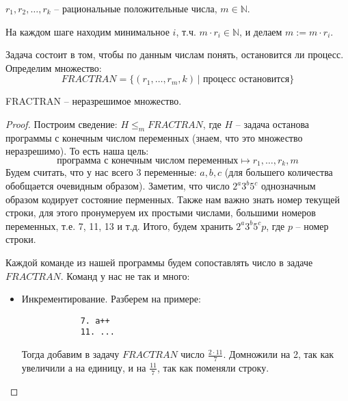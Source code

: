 $r_1, r_2, \dots, r_k$ -- рациональные положительные числа, $m \in \mathbb{N}$.

На каждом шаге находим минимальное $i$, т.ч. $m \cdot r_i \in \mathbb{N}$, и делаем $m := m \cdot r_i$.

Задача состоит в том, чтобы по данным числам понять, остановится ли процесс. Определим множество: \[ FRACTRAN = \{ (r_1, \dots, r_m, k) \, | \text{ процесс остановится} \} \]

\begin{theorem}
    FRACTRAN -- неразрешимое множество.
\end{theorem}
\begin{proof}
    Построим сведение: $H \leqslant_m FRACTRAN$, где $H$ -- задача останова программы с конечным числом переменных (знаем, что это множество неразрешимо). То есть наша цель: \[ \text{программа с конечным числом переменных} \mapsto r_1, \dots, r_k, m \]
    Будем считать, что у нас всего 3 переменные: $a, b, c$ (для большего количества обобщается очевидным образом). Заметим, что число $2^a3^b5^c$ однозначным образом кодирует состояние перменных. Также нам важно знать номер текущей строки, для этого пронумеруем их простыми числами, большими номеров переменных, т.е. 7, 11, 13 и т.д. Итого, будем хранить  $2^a3^b5^cp$, где $p$ -- номер строки. 

    Каждой команде из нашей программы будем сопоставлять число в задаче $FRACTRAN$. Команд у нас не так и много: \begin{itemize}
        \item Инкрементирование. Разберем на примере: \begin{lstlisting}
            7. a++
            11. ...
        \end{lstlisting}
        Тогда добавим в задачу $FRACTRAN$ число $\frac{2 \cdot 11}{7}$. Домножили на 2, так как увеличили а на единицу, и на $\frac{11}{7}$, так как поменяли строку.


\end{itemize}
\end{proof}
